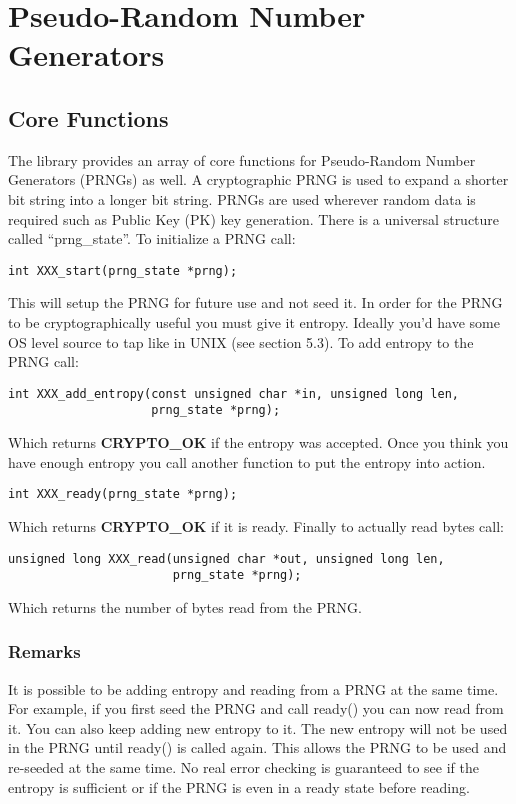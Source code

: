 \documentclass{book}
\begin{document}
\chapter{Pseudo-Random Number Generators}
\section{Core Functions}

The library provides an array of core functions for Pseudo-Random Number Generators (PRNGs) as well.  A cryptographic PRNG is
used to expand a shorter bit string into a longer bit string.  PRNGs are used wherever random data is required such as Public Key (PK)
key generation.  There is a universal structure called ``prng\_state''.  To initialize a PRNG call:
\begin{verbatim}
int XXX_start(prng_state *prng);
\end{verbatim}

This will setup the PRNG for future use and not seed it.  In order 
for the PRNG to be cryptographically useful you must give it entropy.  Ideally you'd have some OS level source to tap 
like in UNIX (see section 5.3).  To add entropy to the PRNG call:
\begin{verbatim}
int XXX_add_entropy(const unsigned char *in, unsigned long len, 
                    prng_state *prng);
\end{verbatim}

Which returns {\bf CRYPTO\_OK} if the entropy was accepted.  Once you think you have enough entropy you call another
function to put the entropy into action.
\begin{verbatim}
int XXX_ready(prng_state *prng);
\end{verbatim}

Which returns {\bf CRYPTO\_OK} if it is ready.  Finally to actually read bytes call:
\begin{verbatim}
unsigned long XXX_read(unsigned char *out, unsigned long len,
                       prng_state *prng);
\end{verbatim}

Which returns the number of bytes read from the PRNG.

\subsection{Remarks}

It is possible to be adding entropy and reading from a PRNG at the same time.  For example, if you first seed the PRNG
and call ready() you can now read from it.  You can also keep adding new entropy to it.  The new entropy will not be used
in the PRNG until ready() is called again.  This allows the PRNG to be used and re-seeded at the same time.  No real error 
checking is guaranteed to see if the entropy is sufficient or if the PRNG is even in a ready state before reading.
\end{document}
